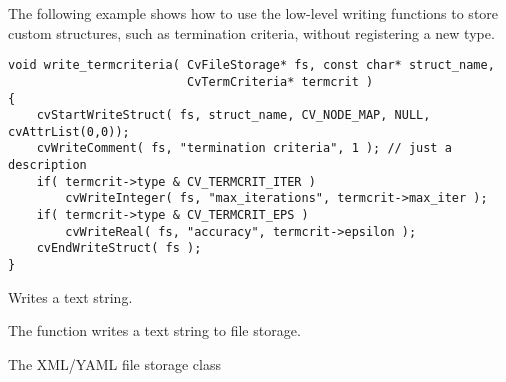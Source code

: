 The following example shows how to use the low-level writing functions
to store custom structures, such as termination criteria, without
registering a new type.

\begin{lstlisting}
void write_termcriteria( CvFileStorage* fs, const char* struct_name,
                         CvTermCriteria* termcrit )
{
    cvStartWriteStruct( fs, struct_name, CV_NODE_MAP, NULL, cvAttrList(0,0));
    cvWriteComment( fs, "termination criteria", 1 ); // just a description
    if( termcrit->type & CV_TERMCRIT_ITER )
        cvWriteInteger( fs, "max_iterations", termcrit->max_iter );
    if( termcrit->type & CV_TERMCRIT_EPS )
        cvWriteReal( fs, "accuracy", termcrit->epsilon );
    cvEndWriteStruct( fs );
}
\end{lstlisting}

Writes a text string.


\begin{description}
\end{description}

The function writes a text string to file storage.

\fi

\fi

\ifCpp

The XML/YAML file storage class

